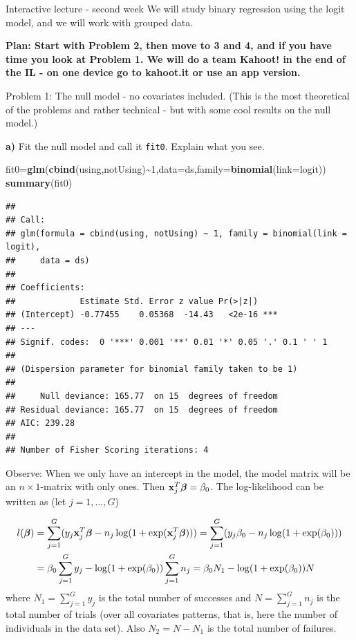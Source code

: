 \documentclass[
  ignorenonframetext,
]{beamer}
\newenvironment{Shaded}{\begin{snugshade}}{\end{snugshade}}
\newcommand{\AttributeTok}[1]{\textcolor[rgb]{0.13,0.29,0.53}{#1}}
\newcommand{\DecValTok}[1]{\textcolor[rgb]{0.00,0.00,0.81}{#1}}
\newcommand{\FunctionTok}[1]{\textcolor[rgb]{0.13,0.29,0.53}{\textbf{#1}}}
\newcommand{\NormalTok}[1]{#1}
\newcommand{\OtherTok}[1]{\textcolor[rgb]{0.56,0.35,0.01}{#1}}
\newcommand{\SpecialCharTok}[1]{\textcolor[rgb]{0.81,0.36,0.00}{\textbf{#1}}}
\begin{document}
\begin{frame}[fragile]{Interactive lecture - second week}
We will study binary regression using the logit model, and we will work
with grouped data.

\textbf{Plan: Start with Problem 2, then move to 3 and 4, and if you
have time you look at Problem 1. We will do a team Kahoot! in the end of
the IL - on one device go to kahoot.it or use an app version. }

\begin{block}{Problem 1: The null model - no covariates included.}
\protect\hypertarget{problem-1-the-null-model---no-covariates-included.}{}
(This is the most theoretical of the problems and rather technical - but
with some cool results on the null model.)

\textbf{a)} Fit the null model and call it \texttt{fit0}. Explain what
you see.

\begin{Shaded}
\begin{Highlighting}[]
\NormalTok{fit0}\OtherTok{=}\FunctionTok{glm}\NormalTok{(}\FunctionTok{cbind}\NormalTok{(using,notUsing)}\SpecialCharTok{\textasciitilde{}}\DecValTok{1}\NormalTok{,}\AttributeTok{data=}\NormalTok{ds,}\AttributeTok{family=}\FunctionTok{binomial}\NormalTok{(}\AttributeTok{link=}\NormalTok{logit))}
\FunctionTok{summary}\NormalTok{(fit0)}
\end{Highlighting}
\end{Shaded}

\begin{verbatim}
## 
## Call:
## glm(formula = cbind(using, notUsing) ~ 1, family = binomial(link = logit), 
##     data = ds)
## 
## Coefficients:
##             Estimate Std. Error z value Pr(>|z|)    
## (Intercept) -0.77455    0.05368  -14.43   <2e-16 ***
## ---
## Signif. codes:  0 '***' 0.001 '**' 0.01 '*' 0.05 '.' 0.1 ' ' 1
## 
## (Dispersion parameter for binomial family taken to be 1)
## 
##     Null deviance: 165.77  on 15  degrees of freedom
## Residual deviance: 165.77  on 15  degrees of freedom
## AIC: 239.28
## 
## Number of Fisher Scoring iterations: 4
\end{verbatim}

Observe: When we only have an intercept in the model, the model matrix
will be an \(n \times 1\)-matrix with only ones. Then
\({\bf x}_j^T\boldsymbol{\beta}=\beta_0\). The log-likelihood can be
written as (let \(j=1,\ldots,G\))

\begin{align} l(\boldsymbol{\beta}) &=\sum_{j=1}^G (y_j{\bf x}_j^T \boldsymbol{\beta} - n_j \log(1+\exp({\bf x}_j^T\boldsymbol{\beta})))= \sum_{j=1}^G (y_j\beta_0 - n_j \log(1+\exp(\beta_0)))\\
&= \beta_0 \sum_{j=1}^G y_j - \log(1+\exp(\beta_0))\sum_{j=1}^G n_j =\beta_0 N_1 - \log(1+\exp(\beta_0))N
\end{align} where \(N_1=\sum_{j=1}^G y_j\) is the total number of
successes and \(N=\sum_{j=1}^G n_j\) is the total number of trials (over
all covariates patterns, that is, here the number of individuals in the
data set). Also \(N_2=N-N_1\) is the total number of failures.


\end{block}
\end{frame}
\end{document}
